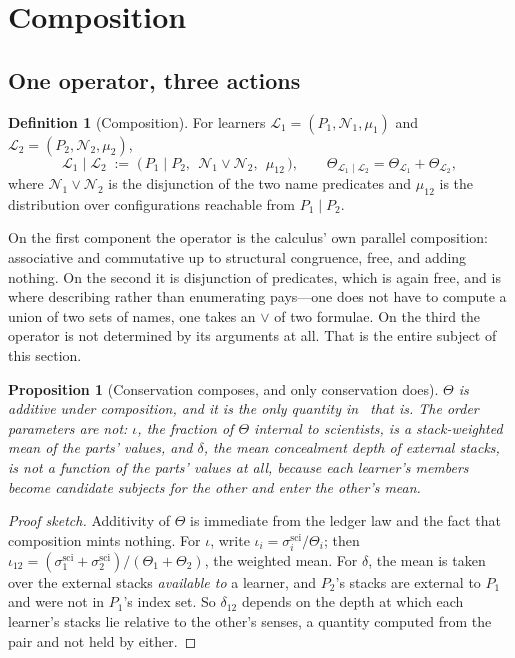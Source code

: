 \documentclass[11pt,a4paper]{article}
\theoremstyle{plain}
\newtheorem{proposition}[theorem]{Proposition}
\theoremstyle{definition}
\newtheorem{definition}[theorem]{Definition}
\theoremstyle{remark}
\newcommand{\Lrn}{\mathcal{L}}
\newcommand{\Nsp}{\mathcal{N}}
\begin{document}
\section{Composition}\label{sec:comp}

\subsection{One operator, three actions}

\begin{definition}[Composition]\label{def:comp}
For learners $\Lrn_1 = (P_1,\Nsp_1,\mu_1)$ and $\Lrn_2 = (P_2,\Nsp_2,\mu_2)$,
\[
  \Lrn_1 \mid \Lrn_2 \;:=\; \bigl(\,P_1 \mid P_2,\ \ \Nsp_1 \vee \Nsp_2,\ \ \mu_{12}\,\bigr),
  \qquad \Theta_{\Lrn_1 \mid \Lrn_2} = \Theta_{\Lrn_1} + \Theta_{\Lrn_2},
\]
where $\Nsp_1 \vee \Nsp_2$ is the disjunction of the two name predicates and $\mu_{12}$ is the
distribution over configurations reachable from $P_1 \mid P_2$.
\end{definition}

On the first component the operator is the calculus' own parallel composition: associative and
commutative up to structural congruence, free, and adding nothing. On the second it is
disjunction of predicates, which is again free, and is where describing rather than enumerating
pays---one does not have to compute a union of two sets of names, one takes an $\vee$ of two
formulae. On the third the operator is not determined by its arguments at all. That is the
entire subject of this section.

\begin{proposition}[Conservation composes, and only conservation does]
$\Theta$ is additive under composition, and it is the only quantity in~\cite[\S13]{scientist}
that is. The order parameters are not: $\iota$, the fraction of $\Theta$ internal to scientists,
is a stack-weighted mean of the parts' values, and $\delta$, the mean concealment depth of
external stacks, is not a function of the parts' values at all, because each learner's members
become candidate subjects for the other and enter the other's mean.
\end{proposition}

\begin{proof}[Proof sketch]
Additivity of $\Theta$ is immediate from the ledger law and the fact that composition mints
nothing. For $\iota$, write $\iota_i = \sigma^{\mathrm{sci}}_i / \Theta_i$; then
$\iota_{12} = (\sigma^{\mathrm{sci}}_1 + \sigma^{\mathrm{sci}}_2)/(\Theta_1+\Theta_2)$, the
weighted mean. For $\delta$, the mean is taken over the external stacks \emph{available to} a
learner, and $P_2$'s stacks are external to $P_1$ and were not in $P_1$'s index set. So
$\delta_{12}$ depends on the depth at which each learner's stacks lie relative to the other's
senses, a quantity computed from the pair and not held by either.
\end{proof}
\end{document}
